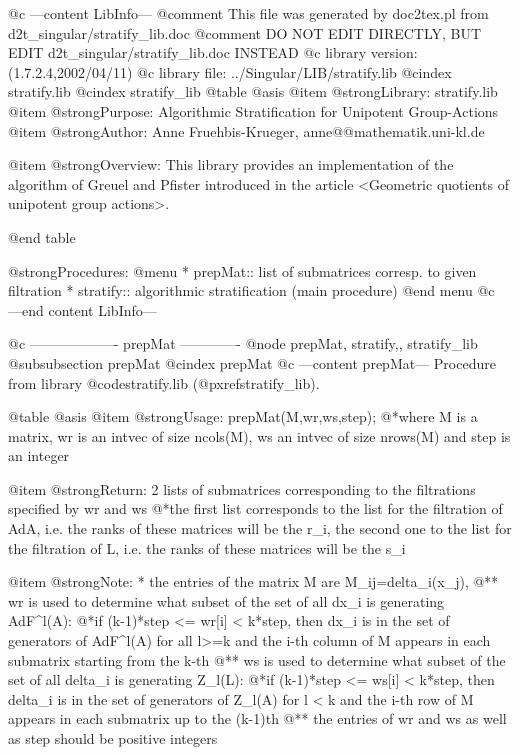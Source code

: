 @c ---content LibInfo---
@comment This file was generated by doc2tex.pl from d2t_singular/stratify_lib.doc
@comment DO NOT EDIT DIRECTLY, BUT EDIT d2t_singular/stratify_lib.doc INSTEAD
@c library version: (1.7.2.4,2002/04/11)
@c library file: ../Singular/LIB/stratify.lib
@cindex stratify.lib
@cindex stratify_lib
@table @asis
@item @strong{Library:}
stratify.lib
@item @strong{Purpose:}
   Algorithmic Stratification for Unipotent Group-Actions
@item @strong{Author:}
Anne Fruehbis-Krueger, anne@@mathematik.uni-kl.de

@item @strong{Overview:}
This library provides an implementation of the algorithm
of Greuel and Pfister introduced in the article <Geometric
quotients of unipotent group actions>.

@end table

@strong{Procedures:}
@menu
* prepMat:: list of submatrices corresp. to given filtration
* stratify:: algorithmic stratification (main procedure)
@end menu
@c ---end content LibInfo---

@c ------------------- prepMat -------------
@node prepMat, stratify,, stratify_lib
@subsubsection prepMat
@cindex prepMat
@c ---content prepMat---
Procedure from library @code{stratify.lib} (@pxref{stratify_lib}).

@table @asis
@item @strong{Usage:}
prepMat(M,wr,ws,step);
@*where M is a matrix, wr is an intvec of size ncols(M),
ws an intvec of size nrows(M) and step is an integer

@item @strong{Return:}
2 lists of submatrices corresponding to the filtrations
specified by wr and ws
@*the first list corresponds to the list for the filtration
of AdA, i.e. the ranks of these matrices will be the r_i,
the second one to the list for the filtration of L, i.e.
the ranks of these matrices will be the s_i

@item @strong{Note:}
* the entries of the matrix M are M_ij=delta_i(x_j),
@** wr is used to determine what subset of the set of all dx_i is
generating AdF^l(A):
@*if (k-1)*step <= wr[i] < k*step, then dx_i is in the set of
generators of AdF^l(A) for all l>=k and the i-th column
of M appears in each submatrix starting from the k-th
@** ws is used to determine what subset of the set of all delta_i
is generating Z_l(L):
@*if (k-1)*step <= ws[i] < k*step, then delta_i is in the set
of generators of Z_l(A) for l < k and the i-th row of M
appears in each submatrix up to the (k-1)th
@** the entries of wr and ws as well as step should be positive
integers

